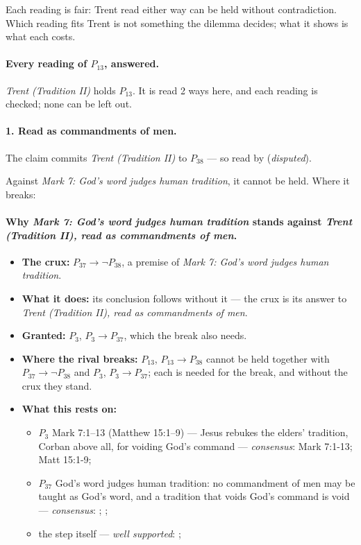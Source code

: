 \documentclass[11pt]{article}
\begin{document}
Each reading is fair: Trent read either way can be held without contradiction. Which reading fits Trent is not something the dilemma decides; what it shows is what each costs.

\paragraph{Every reading of \(P_{13}\), answered.} \emph{Trent (Tradition II)} holds \(P_{13}\). It is read 2 ways here, and each reading is checked; none can be left out.

\paragraph{1. Read as commandments of men.} The claim commits \emph{Trent (Tradition II)} to \(P_{38}\) --- so read by \cite[IV.x.23]{calvin-institutes-1960} (\emph{disputed}).

Against \emph{Mark 7: God's word judges human tradition}, it cannot be held. Where it breaks:
\paragraph{Why \emph{Mark 7: God's word judges human tradition} stands against \emph{Trent (Tradition II), read as commandments of men}.}
\begin{itemize}
\item \textbf{The crux:} \(P_{37} \rightarrow \lnot P_{38}\), a premise of \emph{Mark 7: God's word judges human tradition}.
\item \textbf{What it does:} its conclusion follows without it --- the crux is its answer to \emph{Trent (Tradition II), read as commandments of men}.
\item \textbf{Granted:} \(P_{3}\), \(P_{3} \rightarrow P_{37}\), which the break also needs.
\item \textbf{Where the rival breaks:} \(P_{13}\), \(P_{13} \rightarrow P_{38}\) cannot be held together with \(P_{37} \rightarrow \lnot P_{38}\) and \(P_{3}\), \(P_{3} \rightarrow P_{37}\); each is needed for the break, and without the crux they stand.
\item \textbf{What this rests on:}
\begin{itemize}
\item \(P_{3}\) Mark 7:1–13 (Matthew 15:1–9) — Jesus rebukes the elders' tradition, Corban above all, for voiding God's command --- \emph{consensus}: Mark 7:1-13; Matt 15:1-9; \cite[IV.x.10]{calvin-institutes-1960}
\item \(P_{37}\) God's word judges human tradition: no commandment of men may be taught as God's word, and a tradition that voids God's command is void --- \emph{consensus}: \cite[Vatican II (1965), Dei Verbum 10]{tanner-decrees-1990}; \cite[IV.x.23]{calvin-institutes-1960}; \cite{florovsky-bible-church-tradition-1972}
\item the step itself --- \emph{well supported}: \cite[Vatican II (1965), Dei Verbum 10]{tanner-decrees-1990}; \cite[IV.x.23]{calvin-institutes-1960}
\end{itemize}
\end{itemize}
\end{document}
